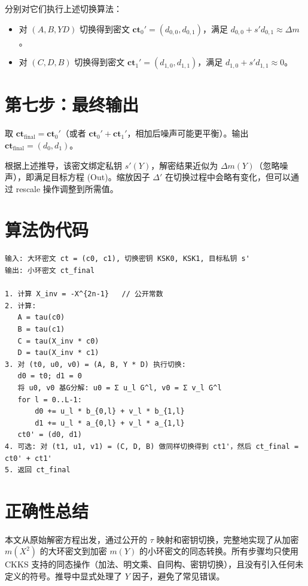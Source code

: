 \documentclass{article}
\begin{document}
分别对它们执行上述切换算法：
\begin{itemize}
  \item 对 $(A, B, Y D)$ 切换得到密文 $\mathbf{ct}_0' = (d_{0,0}, d_{0,1})$，满足 $d_{0,0} + s' d_{0,1} \approx \Delta m$。
  \item 对 $(C, D, B)$ 切换得到密文 $\mathbf{ct}_1' = (d_{1,0}, d_{1,1})$，满足 $d_{1,0} + s' d_{1,1} \approx 0$。
\end{itemize}

\section{第七步：最终输出}
取 $\mathbf{ct}_{\text{final}} = \mathbf{ct}_0'$（或者 $\mathbf{ct}_0' + \mathbf{ct}_1'$，相加后噪声可能更平衡）。输出 $\mathbf{ct}_{\text{final}} = (d_0, d_1)$。

根据上述推导，该密文绑定私钥 $s'(Y)$，解密结果近似为 $\Delta m(Y)$（忽略噪声），即满足目标方程 (Out)。缩放因子 $\Delta'$ 在切换过程中会略有变化，但可以通过 rescale 操作调整到所需值。

\section{算法伪代码}

\begin{verbatim}
输入: 大环密文 ct = (c0, c1), 切换密钥 KSK0, KSK1, 目标私钥 s'
输出: 小环密文 ct_final

1. 计算 X_inv = -X^{2n-1}   // 公开常数
2. 计算:
   A = tau(c0)
   B = tau(c1)
   C = tau(X_inv * c0)
   D = tau(X_inv * c1)
3. 对 (t0, u0, v0) = (A, B, Y * D) 执行切换:
   d0 = t0; d1 = 0
   将 u0, v0 基G分解: u0 = Σ u_l G^l, v0 = Σ v_l G^l
   for l = 0..L-1:
       d0 += u_l * b_{0,l} + v_l * b_{1,l}
       d1 += u_l * a_{0,l} + v_l * a_{1,l}
   ct0' = (d0, d1)
4. 可选: 对 (t1, u1, v1) = (C, D, B) 做同样切换得到 ct1'，然后 ct_final = ct0' + ct1'
5. 返回 ct_final
\end{verbatim}

\section{正确性总结}
本文从原始解密方程出发，通过公开的 $\tau$ 映射和密钥切换，完整地实现了从加密 $m(X^2)$ 的大环密文到加密 $m(Y)$ 的小环密文的同态转换。所有步骤均只使用 CKKS 支持的同态操作（加法、明文乘、自同构、密钥切换），且没有引入任何未定义的符号。推导中显式处理了 $Y$ 因子，避免了常见错误。

\appendix
\end{document}
